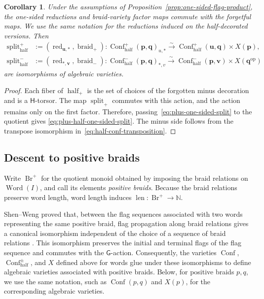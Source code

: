 \documentclass[10pt,a4paper]{article}
\newtheorem{corollary}[theorem]{Corollary}
\theoremstyle{definition}
\theoremstyle{remark}
\newcommand{\groupG}{\mathsf{G}}
\newcommand{\torusH}{\mathsf{H}}
\newcommand{\Conf}{\operatorname{Conf}}
\newcommand{\Confhalf}{\operatorname{Conf}_{\mathrm{half}}}
\newcommand{\Split}{\operatorname{split}}
\newcommand{\len}{\operatorname{len}}
\newcommand{\Br}{\operatorname{Br}}
\newcommand{\Word}{\operatorname{Word}}
\begin{document}
\begin{corollary}
\label{cor:half-one-sided-flag-product}
Under the assumptions of Proposition~\ref{prop:one-sided-flag-product}, the
one-sided reductions and braid-variety factor maps commute with the forgetful
maps.  We use the same notation for the reductions induced on the
half-decorated versions.  Then
\begin{align}
 \Split_{\mathrm{half}}^+
 &:=(\operatorname{red}_{\mathbf u,*},\operatorname{braid}_+):
 \Confhalf^+(\mathbf p,\mathbf q)_{u,*}
 \xrightarrow{\sim}
 \Confhalf^+(\mathbf u,\mathbf q)
 \times X(\mathbf p),
 \label{eq:plus-half-one-sided-split}\\
 \Split_{\mathrm{half}}^-
 &:=(\operatorname{red}_{*,\mathbf v},\operatorname{braid}_-):
 \Confhalf^-(\mathbf p,\mathbf q)_{*,v}
 \xrightarrow{\sim}
 \Confhalf^-(\mathbf p,\mathbf v)
 \times X(\mathbf q^{\mathrm{op}})
 \label{eq:minus-half-one-sided-split}
\end{align}
are isomorphisms of algebraic varieties.
\end{corollary}

\begin{proof}
Each fiber of \(\operatorname{half}_+\) is the set of choices of the forgotten
minus decoration and is a \(\torusH\)-torsor.  The map \(\Split_+\) commutes
with this action, and the action remains only on the first factor.  Therefore,
passing~\eqref{eq:plus-one-sided-split} to the quotient gives
\eqref{eq:plus-half-one-sided-split}.  The minus side follows from the
transpose isomorphism in~\eqref{eq:half-conf-transposition}.
\end{proof}

\subsection{Descent to positive braids}
\label{subsec:positive-braid-descent}

Write \(\Br^+\) for the quotient monoid obtained by imposing the braid
relations on \(\Word(I)\), and call its elements \emph{positive braids}.
Because the braid relations preserve word length, word length induces
\(\len:\Br^+\to\mathbb N\).

Shen--Weng proved that, between the flag sequences associated with two words
representing the same positive braid, flag propagation along braid relations
gives a canonical isomorphism independent of the choice of a sequence of braid
relations \cite[Theorem~2.18]{ShenWeng2021}.  This isomorphism preserves the
initial and terminal flags of the flag sequence and commutes with the
\(\groupG\)-action.  Consequently, the varieties \(\Conf\),
\(\Confhalf^\pm\), and \(X\) defined above for words glue under these
isomorphisms to define algebraic varieties associated with positive braids.
Below, for positive braids \(p,q\), we use the same notation, such as
\(\Conf(p,q)\) and \(X(p)\), for the corresponding algebraic varieties.
\end{document}
